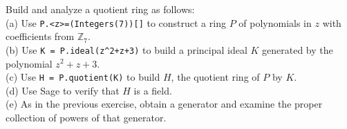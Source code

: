 %
%
Build and analyze a quotient ring as follows:\\
(a) Use \verb?P.<z>=(Integers(7))[]? to construct a ring $P$ of polynomials in $z$ with coefficients from ${\mathbb Z}_7$.\\
(b) Use \verb?K = P.ideal(z^2+z+3)? to build a principal ideal $K$ generated by the polynomial $z^2+z+3$.\\
(c) Use \verb?H = P.quotient(K)? to build $H$, the quotient ring of $P$ by $K$.\\
(d) Use Sage to verify that $H$ is a field. \\
(e) As in the previous exercise, obtain a generator and examine the proper collection of powers of that generator.
\begin{sageverbatim}\end{sageverbatim}
